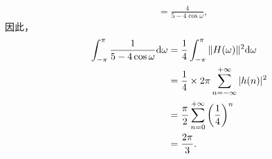 \begin{solution}
\begin{enumerate}[label=(\arabic*)]
\begin{align*}
                & = \frac{4}{5 - 4\cos\omega},
            \end{align*}
            因此，
            \begin{align*}
                \int_{-\pi}^{\pi}\frac{1}{5 - 4\cos\omega}\mathrm{d}\omega & = \frac{1}{4}\int_{-\pi}^{\pi}\|H(\omega)\|^2\mathrm{d}\omega \\
                & = \frac{1}{4}\times 2\pi\sum_{n = -\infty}^{+\infty}|h(n)|^2 \\
                & = \frac{\pi}{2}\sum_{n = 0}^{+\infty}\left(\frac{1}{4}\right)^{n} \\
                & = \frac{2\pi}{3}.
            \end{align*}
    \end{enumerate}
\end{solution}